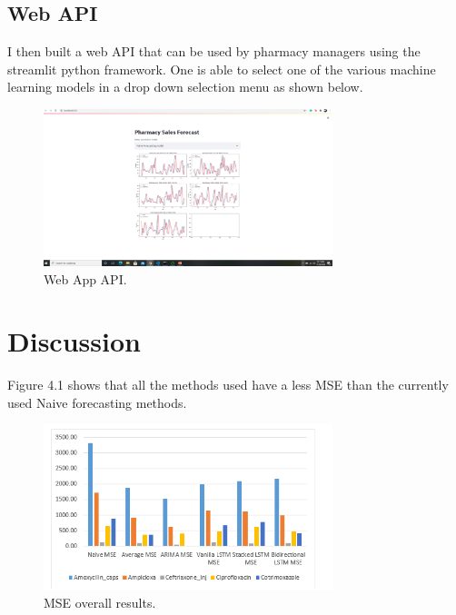 \documentclass[12pt]{report}
\begin{document}
\section{Web API}
I then built a web API that can be used by pharmacy managers using the streamlit python framework. One is able to select one of the various machine learning models in a drop down selection menu as shown below.
\begin{figure}[H]%
  \begin {center}
  \includegraphics[width=0.75\textwidth]{images/WebApp.PNG}
  \caption{Web App API.}
  \label{fig:ecg}
  \end {center}
  \end{figure}

\chapter{Discussion}

Figure 4.1 shows that all the methods used have a less MSE than the currently used Naive forecasting methods.\\
\begin{figure}[H]%
\begin {center}
\includegraphics[width=0.75\textwidth]{images/chart.png}
\caption{MSE overall results.}
\label{fig:ecg}
\end {center}
\end{figure}
\end{document}
